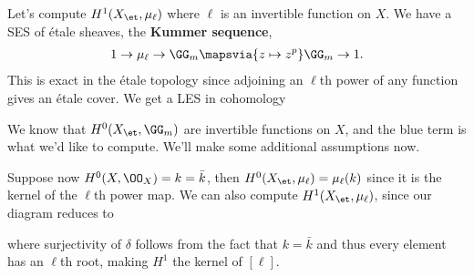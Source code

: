 \begin{example}[?]

Let's compute \(H^1(X_\et, \mu_\ell)\) where \(\ell\) is an invertible
function on \(X\). We have a SES of étale sheaves, the \textbf{Kummer
sequence},
\begin{align*}  
1 \to \mu_\ell \to \GG_m \mapsvia{z\mapsto z^p} \GG_m \to 1
.\end{align*} This is exact in the étale topology since adjoining an
\(\ell\)th power of any function gives an étale cover. We get a LES in
cohomology

\begin{center}
\end{center}

We know that \(H^0(X_\et, \GG_m)\) are invertible functions on \(X\),
and the blue term is what we'd like to compute. We'll make some
additional assumptions now.

Suppose now \(H^0(X, \OO_X) = k = \bar k\), then
\(H^0(X_\et,\mu_\ell) = \mu_\ell(k)\) since it is the kernel of the
\(\ell\)th power map. We can also compute \(H^1(X_\et, \mu_\ell)\),
since our diagram reduces to

\begin{center}
\end{center}

where surjectivity of \(\delta\) follows from the fact that \(k=\bar k\)
and thus every element has an \(\ell\)th root, making \(H^1\) the kernel
of \([\ell]\).

\end{example}

